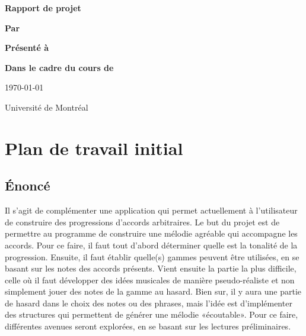 \documentclass[letterpaper,12pt]{scrartcl}
\begin{document}
	\begin{center}
		\vspace{2cm}

		{\Huge\bf\sf Rapport de projet}
		\vspace{4cm}

		{\bf\sf Par}

		\vspace{0.5cm}{\large\bf\sf François Poitras}

		\vspace{2cm}

		{\bf\sf Présenté à}

		\vspace{0.5cm}{\large\bf\sf Olivier Bélanger et Sylvie Hamel}

		\vspace{2cm}

		{\bf\sf Dans le cadre du cours de}

		\vspace{0.5cm}{\large\bf\sf Projet d'informatique (IFT3150)}

		\vspace{\fill}
		
		\today

		\vspace{0.5cm}
		Université de Montréal
	\end{center}

	\newpage
	\pagestyle{plain}
	\section{Plan de travail initial}
	
	\subsection{Énoncé}
	Il s'agit de complémenter une application qui permet actuellement à l'utilisateur de construire des progressions d'accords arbitraires. Le but du projet est de permettre au programme de construire une mélodie agréable qui accompagne les accords. Pour ce faire, il faut tout d'abord déterminer quelle est la tonalité de la progression. Ensuite, il faut établir quelle(s) gammes peuvent être utilisées, en se basant sur les notes des accords présents. Vient ensuite la partie la plus difficile, celle où il faut développer des idées musicales de manière pseudo-réaliste et non simplement jouer des notes de la gamme au hasard. Bien sur, il y aura une partie de hasard dans le choix des notes ou des phrases, mais l'idée est d'implémenter des structures qui permettent de générer une mélodie «écoutable». Pour ce faire, différentes avenues seront explorées, en se basant sur les lectures préliminaires. 
\end{document}
